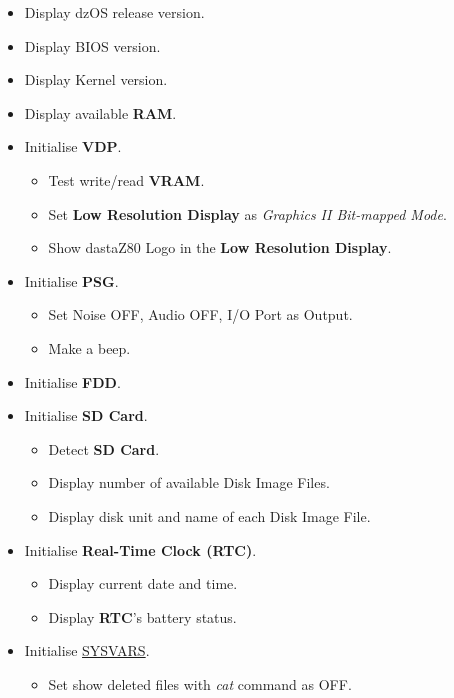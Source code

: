 \begin{itemize}
\begin{itemize}
            \item Display dzOS release version.
            \item Display BIOS version.
            \item Display Kernel version.
            \item Display available \textbf{RAM}.
            \item Initialise \textbf{VDP}.
            \begin{itemize}
                \item Test write/read \textbf{VRAM}.
                \item Set \textbf{Low Resolution Display} as \textit{Graphics II
                Bit-mapped Mode}.
                \item Show dastaZ80 Logo in the \textbf{Low Resolution Display}.
            \end{itemize}
            \item Initialise \textbf{PSG}.
            \begin{itemize}
                \item Set Noise OFF, Audio OFF, I/O Port as Output.
                \item Make a beep.
            \end{itemize}
            \item Initialise \textbf{FDD}.
            \item Initialise \textbf{SD Card}.
            \begin{itemize}
                \item Detect \textbf{SD Card}.
                \item Display number of available Disk Image Files.
                \item Display disk unit and name of each Disk Image File.
            \end{itemize}
            \item Initialise \textbf{Real-Time Clock (RTC)}.
            \begin{itemize}
                \item Display current date and time.
                \item Display \textbf{RTC}'s battery status.
            \end{itemize}
            \item Initialise \hyperref[sec:ram_memmap]{SYSVARS}.
            \begin{itemize}
                \item Set show deleted files with \textit{cat} command as OFF.

\end{itemize}
\end{itemize}
\end{itemize}
